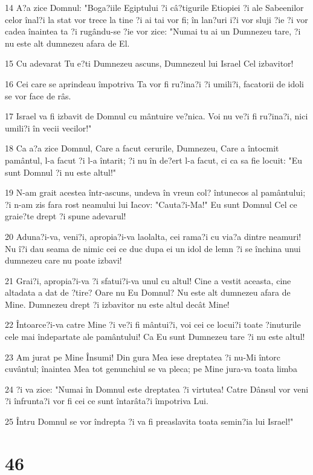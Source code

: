 \par 14 A?a zice Domnul: "Boga?iile Egiptului ?i câ?tigurile Etiopiei ?i ale Sabeenilor celor înal?i la stat vor trece la tine ?i ai tai vor fi; în lan?uri i?i vor sluji ?ie ?i vor cadea înaintea ta ?i rugându-se ?ie vor zice: "Numai tu ai un Dumnezeu tare, ?i nu este alt dumnezeu afara de El.
\par 15 Cu adevarat Tu e?ti Dumnezeu ascuns, Dumnezeul lui Israel Cel izbavitor!
\par 16 Cei care se aprindeau împotriva Ta vor fi ru?ina?i ?i umili?i, facatorii de idoli se vor face de râs.
\par 17 Israel va fi izbavit de Domnul cu mântuire ve?nica. Voi nu ve?i fi ru?ina?i, nici umili?i în vecii vecilor!"
\par 18 Ca a?a zice Domnul, Care a facut cerurile, Dumnezeu, Care a întocmit pamântul, l-a facut ?i l-a întarit; ?i nu în de?ert l-a facut, ci ca sa fie locuit: "Eu sunt Domnul ?i nu este altul!"
\par 19 N-am grait acestea într-ascuns, undeva în vreun col? întunecos al pamântului; ?i n-am zis fara rost neamului lui Iacov: "Cauta?i-Ma!" Eu sunt Domnul Cel ce graie?te drept ?i spune adevarul!
\par 20 Aduna?i-va, veni?i, apropia?i-va laolalta, cei rama?i cu via?a dintre neamuri! Nu î?i dau seama de nimic cei ce duc dupa ei un idol de lemn ?i se închina unui dumnezeu care nu poate izbavi!
\par 21 Grai?i, apropia?i-va ?i sfatui?i-va unul cu altul! Cine a vestit aceasta, cine altadata a dat de ?tire? Oare nu Eu Domnul? Nu este alt dumnezeu afara de Mine. Dumnezeu drept ?i izbavitor nu este altul decât Mine!
\par 22 Întoarce?i-va catre Mine ?i ve?i fi mântui?i, voi cei ce locui?i toate ?inuturile cele mai îndepartate ale pamântului! Ca Eu sunt Dumnezeu tare ?i nu este altul!
\par 23 Am jurat pe Mine Însumi! Din gura Mea iese dreptatea ?i nu-Mi întorc cuvântul; înaintea Mea tot genunchiul se va pleca; pe Mine jura-va toata limba
\par 24 ?i va zice: "Numai în Domnul este dreptatea ?i virtutea! Catre Dânsul vor veni ?i înfrunta?i vor fi cei ce sunt întarâta?i împotriva Lui.
\par 25 Întru Domnul se vor îndrepta ?i va fi preaslavita toata semin?ia lui Israel!"

\chapter{46}

